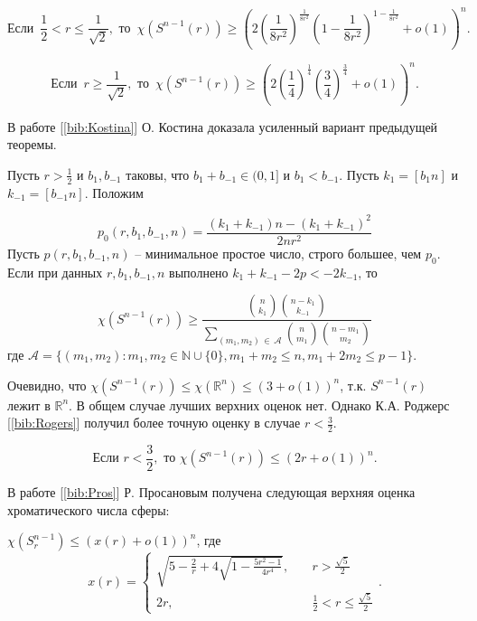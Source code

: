 \begin{theorem1}

$$\text{Если } \, \frac{1}{2} < r \leq \frac{1}{\sqrt{2}}, \text{ то } \,
\chi(S^{n-1}(r)) \geq 
\left(2 \left( \frac{1}{8r^2} \right)^{\frac{1}{8r^2}} \left(1-\frac{1}{8r^2}\right)^{1-\frac{1}{8r^2}} + o(1) \right)^n.$$ 

$$\text{Если } \, r \geq \frac{1}{\sqrt{2}}, \text{ то } \,
\chi(S^{n-1}(r)) \geq 
\left(2 \left( \frac{1}{4}\right)^{\frac{1}{4}} \left(\frac{3}{4}\right)^{\frac{3}{4}} + o(1)\right)^n.$$

\end{theorem1}
В работе [\ref{bib:Kostina}] О. Костина доказала усиленный вариант предыдущей теоремы.

\begin{theorem1}
Пусть $r > \tfrac{1}{2}$ и $b_1, b_{-1}$ таковы, что $b_1 + b_{-1} \in (0,1]$ и $b_1 < b_{-1}$.
Пусть $k_1=[b_1n]$ и $k_{-1}=[b_{-1}n]$. Положим

$$p_0(r,b_1,b_{-1},n) = \frac{(k_1 + k_{-1})n - (k_1 + k_{-1})^2}{2nr^2}$$
Пусть $p(r,b_1,b_{-1},n)$ -- минимальное простое число, строго большее, чем $p_0$. 
Если при данных $r,b_1,b_{-1},n$ выполнено $k_1 + k_{-1} - 2p < -2k_{-1}$, то

$$\chi(S^{n-1}(r)) \geq 
\frac{\binom{n}{k_1}\binom{n-k_1}{k_{-1}}}
{\sum\limits_{(m_1,m_2) \, \in \, \mathcal{A}} \binom{n}{m_1} \binom{n-m_1}{m_2}}$$
где $\mathcal{A} = \{ (m_1,m_2): m_1,m_2 \in \mathbb{N} \cup \{ 0 \}, m_1+m_2 \leq n, m_1+2m_2 \leq p-1 \}$.

\end{theorem1}

Очевидно, что $\chi(S^{n-1}(r)) \leq \chi(\mathbb{R}^n) \leq (3+o(1))^n$, т.к. $S^{n-1}(r)$ лежит в $\mathbb{R}^n$. В общем случае лучших верхних оценок нет. Однако К.А. Роджерс [\ref{bib:Rogers}] получил более точную оценку в случае $r < \frac{3}{2}$.

\begin{theorem1}
$$\text{Если } r < \frac{3}{2}, \text{ то } \chi(S^{n-1}(r)) \leq (2r+o(1))^n.$$
\end{theorem1}

В работе [\ref{bib:Pros}] Р. Просановым получена следующая верхняя оценка хроматического числа сферы:

\begin{theorem1}
$\chi(S_r^{n-1}) \leq (x(r)+o(1))^n$, где
$$ x(r) = 
\begin{cases}
\sqrt{5-\frac{2}{r}+4\sqrt{1-\frac{5r^2-1}{4r^4}}},& \quad r > \frac{\sqrt{5}}{2} \\ 
2r,& \quad \frac{1}{2} < r \leq  \frac{\sqrt{5}}{2}
\end{cases}.$$
\end{theorem1}

